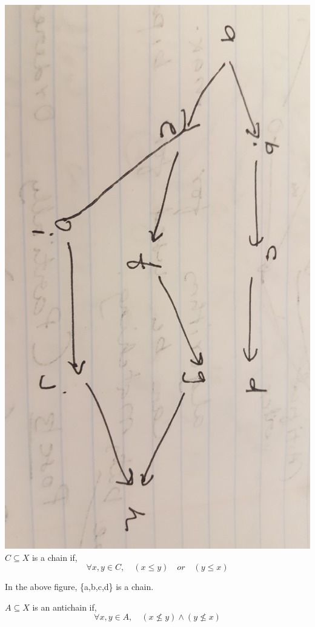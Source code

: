 \documentclass[twoside]{article}
\begin{document}
\includegraphics[width=\textwidth]{20180829_111407_001.jpg}
$C \subseteq X$ is a chain if,
$$\forall x,y \in C,  \quad    (x \leq y)  \quad or  \quad (y \leq x)$$


\begin{flushleft}In the above figure, \{a,b,c,d\} is a chain.\end{flushleft}
\begin{flushleft}
$A \subseteq X $ is an antichain if,
$$ \forall x,y \in A, \quad (x \nleq y) \wedge (y \nleq x)$$
\end{flushleft}
\end{document}
